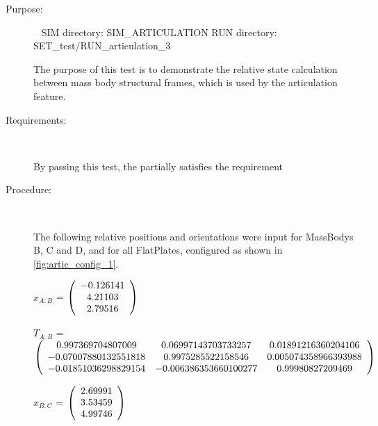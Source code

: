 \label{test:art_test_3}

\begin{description}

\item[Purpose:] \ \newline
SIM directory: SIM\_ARTICULATION
RUN directory: SET\_test/RUN\_articulation\_3

The purpose of this test is to demonstrate the relative state calculation
between mass body structural frames, which is used by the articulation
feature.

\item[Requirements:] \ \newline

By passing this test, the \ModelDesc partially satisfies
the requirement 

\item[Procedure:] \ \newline

The following relative positions and orientations were input for MassBodys
B, C and D, and for all FlatPlates, configured as shown in
\ref{fig:artic_config_1}.

$x_{A:B}$ = $\left( \begin{array} {ccc}  -0.126141 \\    4.21103 \\    2.79516
\end{array} \right)\\ \\$

$T_{A:B}$ = $\left( \begin{array} {ccc}
   0.997369704807009 & 0.06997143703733257 & 0.01891216360204106 \\
   -0.07007880132551818 & 0.9975285522158546 & 0.005074358966393988 \\
   -0.01851036298829154 & -0.006386353660100277 & 0.99980827209469 \\
\end{array} \right)\\ \\$

$x_{B:C}$ = $\left( \begin{array} {ccc}    2.69991 \\    3.53459 \\    4.99746
\end{array} \right)\\ \\$


\end{description}

